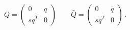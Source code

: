 \begin{equation}
Q = \left(\begin{array}{cc} 0&q\\
s  q^T &0 \end{array}\right)\qquad
\bar Q = \left(\begin{array}{cc} 0&\bar q \\
s  \bar{q}^T &0 \end{array}\right)\,.
\end{equation}

